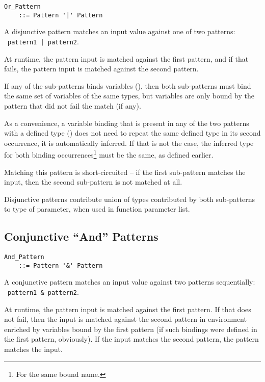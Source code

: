 \grammar\begin{lstlisting}
Or_Pattern 
    ::= Pattern '|' Pattern
\end{lstlisting}

A disjunctive pattern matches an input value against one of two patterns: ~\lstinline!pattern1 | pattern2!. 

At runtime, the pattern input is matched against the first pattern, and if that fails, the pattern input is matched against the second pattern. 

If any of the sub-patterns binds variables (), then both sub-patterns must bind the same set of variables of the same types, but variables are only bound by the pattern that did not fail the match (if any). 

As a convenience, a variable binding that is present in any of the two patterns with a defined type () does not need to repeat the same defined type in its second occurrence, it is automatically inferred. If that is not the case, the inferred type for both binding occurrences\footnote{For the same bound name.} must be the same, as defined earlier. 

Matching this pattern is short-circuited -- if the first sub-pattern matches the input, then the second sub-pattern is not matched at all. 

Disjunctive patterns contribute union of types contributed by both sub-patterns to type of parameter, when used in function parameter list. 





\subsection[Conjunctive “And” Patterns]{Conjunctive ``And'' Patterns}
\label{sec:conjunctive-patterns}

\grammar\begin{lstlisting}
And_Pattern 
    ::= Pattern '&' Pattern
\end{lstlisting}

A conjunctive pattern matches an input value against two patterns sequentially: ~\lstinline!pattern1 & pattern2!. 

At runtime, the pattern input is matched against the first pattern. If that does not fail, then the input is matched against the second pattern in environment enriched by variables bound by the first pattern (if such bindings were defined in the first pattern, obviously). If the input matches the second pattern, the pattern matches the input. 

